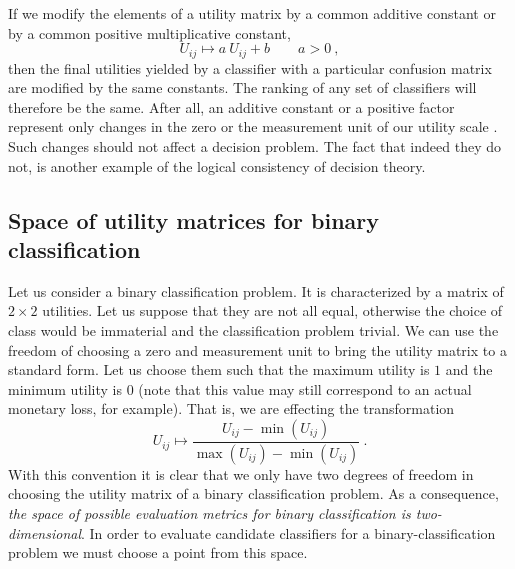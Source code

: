 \documentclass[\ifafour a4paper,12pt,\else a5paper,10pt,\fi%
onecolumn,oneside,article,%
british%
]{memoir}
\theoremstyle{remark}
\theoremstyle{innote}
\renewcommand*{\|}[1][]{\nonscript\:#1\vert\nonscript\:\mathopen{}}
\newcommand*{\sect}{\S}%
\begin{document}
If we modify the elements of a utility matrix by a common additive constant or by a common positive multiplicative constant,
\begin{equation}
  \label{eq:modify_UM}
  U_{ij} \mapsto a\ U_{ij} + b  \qquad a > 0 \ ,
\end{equation}
then the final utilities yielded by a classifier with a particular confusion matrix are modified by the same constants. The ranking of any set of classifiers will therefore be the same. After all, an additive constant or a positive factor represent only changes in the zero or the measurement unit of our utility scale \autocites[cf.][\sect~15.2.2]{russelletal1995_r2022}. Such changes should not affect a decision problem. The fact that indeed they do not, is another example of the logical consistency of decision theory.

\subsection{Space of utility matrices for binary classification}
\label{sec:dt_space_util}

Let us consider a binary classification problem. It is characterized by a matrix of $2 \times 2$ utilities. Let us suppose that they are not all equal, otherwise the choice of class would be immaterial and the classification problem trivial. We can use the freedom of choosing a zero and measurement unit to bring the utility matrix to a standard form. Let us choose them such that the maximum utility is $1$ and the minimum utility is $0$ (note that this value may still correspond to an actual monetary loss, for example). That is, we are effecting the transformation
\begin{equation}
  \label{eq:normalize_utilities}
  U_{ij} \mapsto \frac{U_{ij} - \min(U_{ij})}{\max(U_{ij}) - \min(U_{ij})} \ .
\end{equation}
With this convention it is clear that we only have two degrees of freedom in choosing the utility matrix of a binary classification problem. As a consequence, \emph{the space of possible evaluation metrics for binary classification is two-dimensional}. In order to evaluate candidate classifiers for a binary-classification problem we must choose a point from this space.
\end{document}
